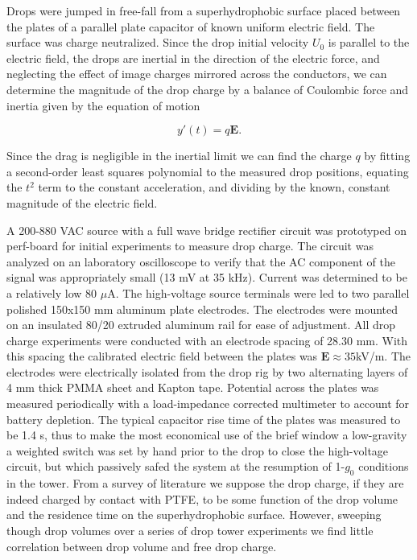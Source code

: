 \documentclass[12pt,a4paper,oneside]{book}
\begin{document}
Drops were jumped in free-fall from a superhydrophobic surface placed between the plates of a parallel plate capacitor of known uniform electric field. The surface was charge neutralized. Since the drop initial velocity $U_0$ is parallel to the electric field, the drops are inertial in the direction of the electric force, and neglecting the effect of image charges mirrored across the conductors, we can determine the magnitude of the drop charge by a balance of Coulombic force and inertia given by the equation of motion

\[ y'(t) = q\mathbf{E}. \]

Since the drag is negligible in the inertial limit we can find the charge $q$ by fitting a second-order least squares polynomial to the measured drop positions, equating the $t^2$ term to the constant acceleration, and dividing by the known, constant magnitude of the electric field.  

A 200-880 VAC source with a full wave bridge rectifier circuit was prototyped on perf-board for initial experiments to measure drop charge. The circuit was analyzed on an laboratory oscilloscope to verify that the AC component of the signal was appropriately small (13 mV at 35 kHz). Current was determined to be a relatively low 80 $\mu$A. The high-voltage source terminals were led to two parallel polished 150x150 mm aluminum plate electrodes. The electrodes were mounted on an insulated 80/20 extruded aluminum rail for ease of adjustment. All drop charge experiments were conducted with an electrode spacing of 28.30 mm. With this spacing the calibrated electric field between the plates was $\mathbf{E} \approx 35$kV/m. The electrodes were electrically isolated from the drop rig by two alternating layers of 4 mm thick PMMA sheet and Kapton tape. Potential across the plates was measured periodically with a load-impedance corrected multimeter to account for battery depletion. The typical capacitor rise time of the plates was measured to be 1.4 s, thus to make the most economical use of the brief window a low-gravity a weighted switch was set by hand prior to the drop to close the high-voltage circuit, but which passively safed the system at the resumption of 1-$g_0$ conditions in the tower. From a survey of literature we suppose the drop charge, if they are indeed charged by contact with PTFE, to be some function of the drop volume and the residence time on the superhydrophobic surface. However, sweeping though drop volumes over a series of drop tower experiments we find little correlation between drop volume  and free drop charge.
\end{document}
